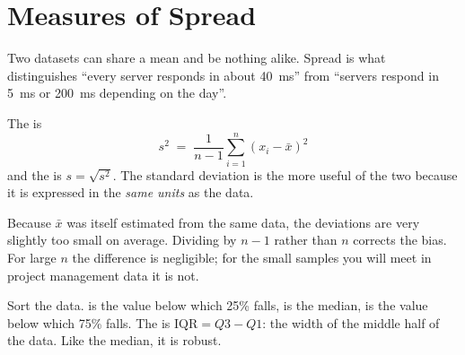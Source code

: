 \section{Measures of Spread}

Two datasets can share a mean and be nothing alike. Spread is what distinguishes
``every server responds in about 40~ms'' from ``servers respond in 5~ms or 200~ms
depending on the day''.

\begin{definitionbox}
The  is
\[
s^2 \;=\; \frac{1}{n-1}\sum_{i=1}^{n}\left(x_i - \bar{x}\right)^2
\]
and the  is $s = \sqrt{s^2}$. The standard deviation is
the more useful of the two because it is expressed in the \emph{same units} as the
data.
\end{definitionbox}

\begin{conceptbox}
Because $\bar{x}$ was itself estimated from the same data, the deviations are very
slightly too small on average. Dividing by $n-1$ rather than $n$ corrects the
bias. For large $n$ the difference is negligible; for the small samples you will
meet in project management data it is not.
\end{conceptbox}

\begin{definitionbox}
Sort the data.  is the value below which 25\% falls,  is the
median,  is the value below which 75\% falls. The  is $\text{IQR} = Q3 - Q1$: the width of the middle half of the data. Like
the median, it is robust.
\end{definitionbox}

